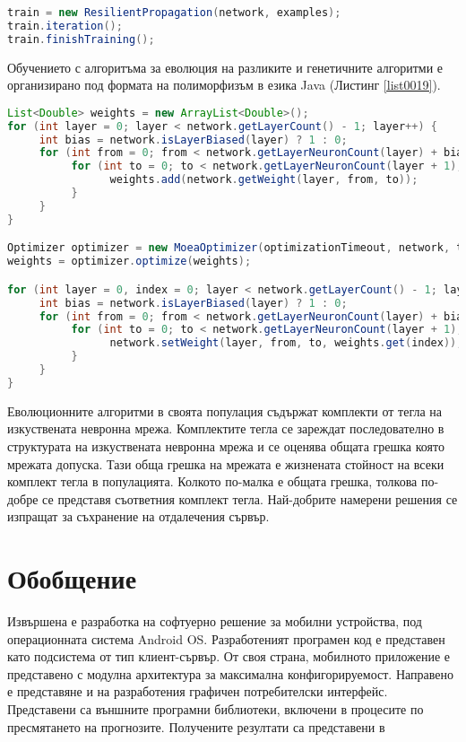 \begin{lstlisting}[caption=Обучение с обратно разпространение на грешката, language=Java, basicstyle=\tiny, label=list0018]
train = new ResilientPropagation(network, examples);
train.iteration();
train.finishTraining();
\end{lstlisting}

Обучението с алгоритъма за еволюция на разликите и генетичните алгоритми е организирано под формата на полиморфизъм в езика Java (Листинг \ref{list0019}).

\begin{lstlisting}[caption=Обучение с еволюционни евристични алгоритми, language=Java, basicstyle=\tiny, label=list0019]
List<Double> weights = new ArrayList<Double>();
for (int layer = 0; layer < network.getLayerCount() - 1; layer++) {
	 int bias = network.isLayerBiased(layer) ? 1 : 0;
	 for (int from = 0; from < network.getLayerNeuronCount(layer) + bias; from++) {
		  for (int to = 0; to < network.getLayerNeuronCount(layer + 1); to++) {
				weights.add(network.getWeight(layer, from, to));
		  }
	 }
}

Optimizer optimizer = new MoeaOptimizer(optimizationTimeout, network, train, populationSize, crossoverRate, scalingFactor);
weights = optimizer.optimize(weights);

for (int layer = 0, index = 0; layer < network.getLayerCount() - 1; layer++) {
	 int bias = network.isLayerBiased(layer) ? 1 : 0;
	 for (int from = 0; from < network.getLayerNeuronCount(layer) + bias; from++) {
		  for (int to = 0; to < network.getLayerNeuronCount(layer + 1); to++, index++) {
				network.setWeight(layer, from, to, weights.get(index));
		  }
	 }
}
\end{lstlisting}

Еволюционните алгоритми в своята популация съдържат комплекти от тегла на изкуствената невронна мрежа. Комплектите тегла се зареждат последователно в структурата на изкуствената невронна мрежа и се оценява общата грешка която мрежата допуска. Тази обща грешка на мрежата е жизнената стойност на всеки комплект тегла в популацията. Колкото по-малка е общата грешка, толкова по-добре се представя съответния комплект тегла. Най-добрите намерени решения се изпращат за съхранение на отдалечения сървър. 

\section{Обобщение}

Извършена е разработка на софтуерно решение за мобилни устройства, под операционната система Android OS. Разработеният програмен код е представен като подсистема от тип клиент-сървър. От своя страна, мобилното приложение е представено с модулна архитектура за максимална конфигорируемост. Направено е представяне и на разработения графичен потребителски интерфейс. Представени са външните програмни библиотеки, включени в процесите по пресмятането на прогнозите. Получените резултати са представени в \cite{Tomov-05, Tomov-06, Tomov-07, Zankinski-02}

